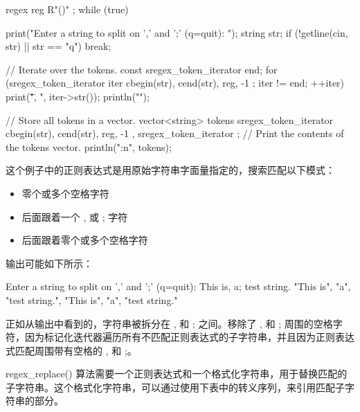 \begin{cpp}
regex reg { R"(\s*[,;]\s*)" };
while (true) {
    print("Enter a string to split on ',' and ';' (q=quit): ");
    string str;
    if (!getline(cin, str) || str == "q") { break; }

    // Iterate over the tokens.
    const sregex_token_iterator end;
    for (sregex_token_iterator iter { cbegin(str), cend(str), reg, -1 };
    iter != end; ++iter) {
        print("\"{}\", ", iter->str());
    }
    println("");

    // Store all tokens in a vector.
    vector<string> tokens {
        sregex_token_iterator { cbegin(str), cend(str), reg, -1 },
        sregex_token_iterator {} };
    // Print the contents of the tokens vector.
    println("{:n}", tokens);
}
\end{cpp}

这个例子中的正则表达式是用原始字符串字面量指定的，搜索匹配以下模式：

\begin{itemize}
\item
零个或多个空格字符

\item
后面跟着一个 , 或 ; 字符

\item
后面跟着零个或多个空格字符
\end{itemize}

输出可能如下所示：

\begin{shell}
Enter a string to split on ',' and ';' (q=quit): This is, a; test string.
"This is", "a", "test string.",
"This is", "a", "test string."
\end{shell}

正如从输出中看到的，字符串被拆分在 , 和 ; 之间。移除了 , 和 ; 周围的空格字符，因为标记化迭代器遍历所有不匹配正则表达式的子字符串，并且因为正则表达式匹配周围带有空格的 , 和 ;。


regex\_replace() 算法需要一个正则表达式和一个格式化字符串，用于替换匹配的子字符串。这个格式化字符串，可以通过使用下表中的转义序列，来引用匹配子字符串的部分。

